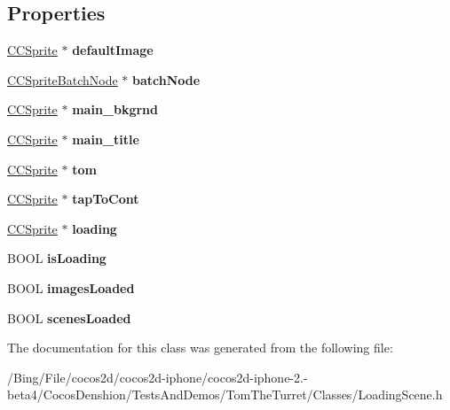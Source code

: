 \subsection*{Properties}
\begin{DoxyCompactItemize}
\item 
\hypertarget{interface_loading_layer_aeb6f0dcfb7bf4428cd4f37a42cd46d09}{\hyperlink{class_c_c_sprite}{C\-C\-Sprite} $\ast$ {\bfseries default\-Image}}\label{interface_loading_layer_aeb6f0dcfb7bf4428cd4f37a42cd46d09}

\item 
\hypertarget{interface_loading_layer_a3926d08e86368631ff325cc1f66c44f2}{\hyperlink{interface_c_c_sprite_batch_node}{C\-C\-Sprite\-Batch\-Node} $\ast$ {\bfseries batch\-Node}}\label{interface_loading_layer_a3926d08e86368631ff325cc1f66c44f2}

\item 
\hypertarget{interface_loading_layer_abda18574864cdd464b755d545dc4b098}{\hyperlink{class_c_c_sprite}{C\-C\-Sprite} $\ast$ {\bfseries main\-\_\-bkgrnd}}\label{interface_loading_layer_abda18574864cdd464b755d545dc4b098}

\item 
\hypertarget{interface_loading_layer_afa57b1a2380777a9f9914f910332a553}{\hyperlink{class_c_c_sprite}{C\-C\-Sprite} $\ast$ {\bfseries main\-\_\-title}}\label{interface_loading_layer_afa57b1a2380777a9f9914f910332a553}

\item 
\hypertarget{interface_loading_layer_ace249fe540a5eea6c68b25fee8eaefd2}{\hyperlink{class_c_c_sprite}{C\-C\-Sprite} $\ast$ {\bfseries tom}}\label{interface_loading_layer_ace249fe540a5eea6c68b25fee8eaefd2}

\item 
\hypertarget{interface_loading_layer_a07ec1de37796bc806a19ea2e5eed4ab9}{\hyperlink{class_c_c_sprite}{C\-C\-Sprite} $\ast$ {\bfseries tap\-To\-Cont}}\label{interface_loading_layer_a07ec1de37796bc806a19ea2e5eed4ab9}

\item 
\hypertarget{interface_loading_layer_ab9966466af25769134433f4fa35a851c}{\hyperlink{class_c_c_sprite}{C\-C\-Sprite} $\ast$ {\bfseries loading}}\label{interface_loading_layer_ab9966466af25769134433f4fa35a851c}

\item 
\hypertarget{interface_loading_layer_ac0c14a919f3141b2d82fbf6e26fc8670}{B\-O\-O\-L {\bfseries is\-Loading}}\label{interface_loading_layer_ac0c14a919f3141b2d82fbf6e26fc8670}

\item 
\hypertarget{interface_loading_layer_a9134ef40c6170d66936c86dca7411c77}{B\-O\-O\-L {\bfseries images\-Loaded}}\label{interface_loading_layer_a9134ef40c6170d66936c86dca7411c77}

\item 
\hypertarget{interface_loading_layer_ae627eacda19831fd81212aebbae22325}{B\-O\-O\-L {\bfseries scenes\-Loaded}}\label{interface_loading_layer_ae627eacda19831fd81212aebbae22325}

\end{DoxyCompactItemize}


The documentation for this class was generated from the following file\-:\begin{DoxyCompactItemize}
\item 
/\-Bing/\-File/cocos2d/cocos2d-\/iphone/cocos2d-\/iphone-\/2.-\/beta4/\-Cocos\-Denshion/\-Tests\-And\-Demos/\-Tom\-The\-Turret/\-Classes/Loading\-Scene.\-h\end{DoxyCompactItemize}
